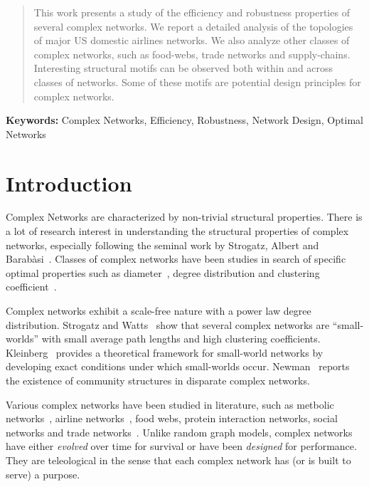 \documentclass[a4paper,10pt]{article}
\begin{document}
\begin{abstract}
This work presents a study of the efficiency and robustness properties of several complex networks. We report a detailed analysis of the topologies of major US domestic airlines networks. We also analyze other classes of complex networks, such as food-webs, trade networks and supply-chains. Interesting structural motifs can be observed both within and across classes of networks. Some of these motifs are potential design principles for complex networks.
\end{abstract}


\textbf{Keywords:} Complex Networks, Efficiency, Robustness, Network Design, Optimal Networks


%
\IEEEpeerreviewmaketitle


\section{Introduction}
Complex Networks are characterized by non-trivial structural properties. There is a lot of research interest in understanding the structural properties of complex networks, especially following the seminal work by Strogatz, Albert and Barab\`{a}si~\cite{albert02, barabasi, strogatz}. Classes of complex networks have been studies in search of specific optimal properties such as diameter~\cite{barabasi99}, degree distribution and clustering coefficient~\cite{watts}.

Complex networks exhibit a scale-free nature with a power law degree distribution. Strogatz and Watts~\cite{watts} show that several complex networks are ``small-worlds'' with small average path lengths and high clustering coefficients. Kleinberg~\cite{kleinberg} provides a theoretical framework for small-world networks by developing exact conditions under which small-worlds occur. Newman~\cite{newman} reports the existence of community structures in disparate complex networks.

Various complex networks have been studied in literature, such as metbolic networks~\cite{guimera07, amaral08}, airline networks~\cite{guimera04, amaral05}, food webs, protein interaction networks, social networks and trade networks~\cite{vespignani}. Unlike random graph models, complex networks have either \textit{evolved} over time for survival or have been \textit{designed} for performance. They are teleological in the sense that each complex network has (or is built to serve) a purpose.
\end{document}
